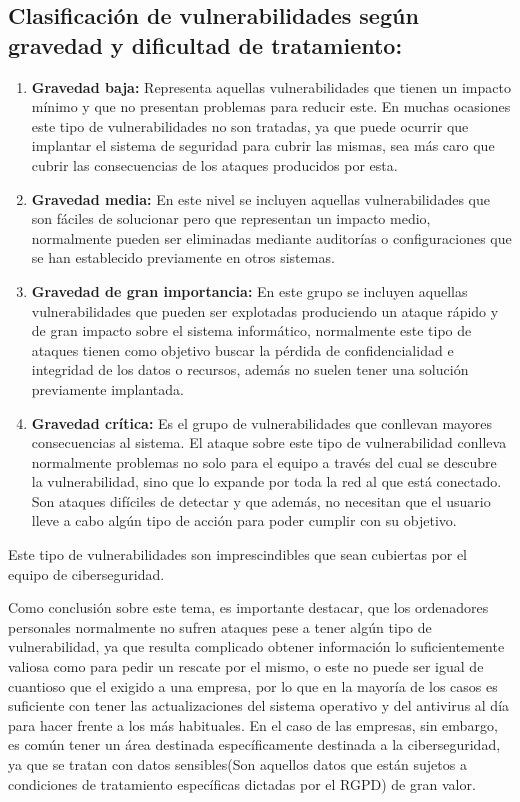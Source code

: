 \subsection{Clasificación de vulnerabilidades según gravedad y dificultad de tratamiento:}
\begin{enumerate}
\item {\bfseries Gravedad baja: }
Representa aquellas vulnerabilidades que tienen un impacto mínimo y que no presentan problemas para reducir este. En muchas ocasiones este tipo de vulnerabilidades no son tratadas, ya que puede ocurrir que implantar el sistema de seguridad para cubrir las mismas, sea más caro que cubrir las consecuencias de los ataques producidos por esta.
\item {\bfseries Gravedad media: }
En este nivel se incluyen aquellas vulnerabilidades que son fáciles de solucionar pero que representan un impacto medio, normalmente pueden ser eliminadas mediante auditorías o configuraciones que se han establecido previamente en otros sistemas.
\item {\bfseries Gravedad de gran importancia:}
En este grupo se incluyen aquellas vulnerabilidades que pueden ser explotadas produciendo un ataque rápido y de gran impacto sobre el sistema informático, normalmente este tipo de ataques tienen como objetivo buscar la pérdida de confidencialidad e integridad de los datos o recursos, además no suelen tener una solución previamente implantada.
\item {\bfseries Gravedad crítica: }
Es el grupo de vulnerabilidades que conllevan mayores consecuencias al sistema. El ataque sobre este tipo de vulnerabilidad conlleva normalmente problemas no solo para el equipo a través del cual se descubre la vulnerabilidad, sino que lo expande por toda la red al que está conectado. Son ataques difíciles de detectar y que además, no necesitan que el usuario lleve a cabo algún tipo de acción para poder cumplir con su objetivo.
\end{enumerate}
Este tipo de vulnerabilidades son imprescindibles que sean cubiertas por el equipo de ciberseguridad.

Como conclusión sobre este tema, es importante destacar, que los ordenadores personales normalmente no sufren ataques pese a tener algún tipo de vulnerabilidad, ya que resulta complicado obtener información lo suficientemente valiosa como para pedir un rescate por el mismo, o este no puede ser igual de cuantioso que el exigido a una empresa, por lo que en la mayoría de los casos es suficiente con tener las actualizaciones del sistema operativo y del antivirus al día para hacer frente a los más habituales.
En el caso de las empresas, sin embargo, es común tener un área destinada específicamente destinada a la ciberseguridad, ya que se tratan con datos sensibles(Son aquellos datos que están sujetos a condiciones de tratamiento específicas dictadas por el RGPD) de gran valor. 





